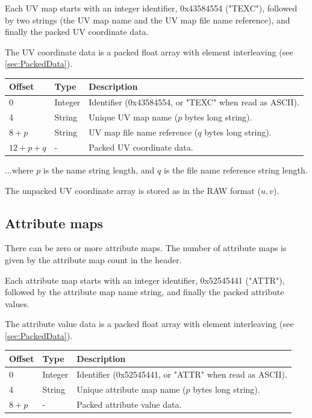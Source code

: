 Each UV map starts with an integer identifier, 0x43584554 ("TEXC"), followed
by two strings (the UV map name and the UV map file name reference), and
finally the packed UV coordinate data.

The UV coordinate data is a packed float array with element interleaving
(see \ref{sec:PackedData}).

\begin{tabular}{|l|l|l|}\hline
\textbf{Offset} &  \textbf{Type} & \textbf{Description}\\ \hline
0 & Integer & Identifier (0x43584554, or "TEXC" when read as ASCII).\\ \hline
4 & String & Unique UV map name ($p$ bytes long string).\\ \hline
$8+p$ & String & UV map file name reference ($q$ bytes long string).\\ \hline
$12+p+q$ & - & Packed UV coordinate data.\\ \hline
\end{tabular}

...where $p$ is the name string length, and $q$ is the file name reference string
length.

The unpacked UV coordinate array is stored as in the RAW format ($u, v$).

\subsection{Attribute maps}
There can be zero or more attribute maps. The number of attribute maps is given by the
attribute map count in the header.

Each attribute map starts with an integer identifier, 0x52545441 ("ATTR"), followed
by the attribute map name string, and finally the packed attribute values.

The attribute value data is a packed float array with element interleaving
(see \ref{sec:PackedData}).

\begin{tabular}{|l|l|l|}\hline
\textbf{Offset} &  \textbf{Type} & \textbf{Description}\\ \hline
0 & Integer & Identifier (0x52545441, or "ATTR" when read as ASCII).\\ \hline
4 & String & Unique attribute map name ($p$ bytes long string).\\ \hline
$8+p$ & - & Packed attribute value data.\\ \hline
\end{tabular}

